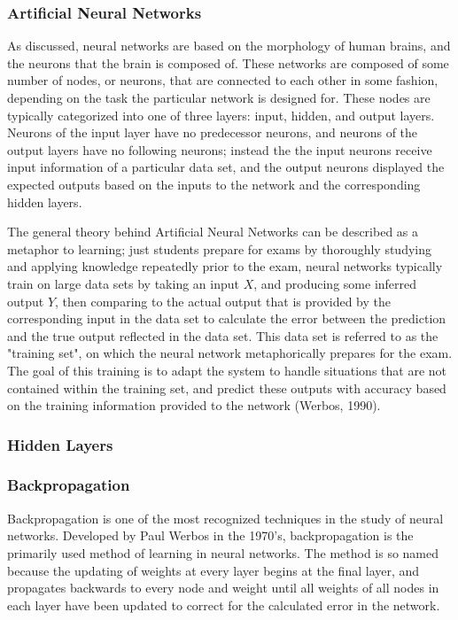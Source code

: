 \documentclass{article}
\begin{document}
\subsubsection{Artificial Neural Networks}
As discussed, neural networks are based on the morphology of human brains, and the neurons that the brain is composed of. These networks are composed of some number of nodes, or neurons, that are connected to each other in some fashion, depending on the task the particular network is designed for. These nodes are typically categorized into one of three layers: input, hidden, and output layers. Neurons of the input layer have no predecessor neurons, and neurons of the output layers have no following neurons; instead the the input neurons receive input information of a particular data set, and the output neurons displayed the expected outputs based on the inputs to the network and the corresponding hidden layers.\par

The general theory behind Artificial Neural Networks can be described as a metaphor to learning; just students prepare for exams by thoroughly studying and applying knowledge repeatedly prior to the exam, neural networks typically train on large data sets by taking an input $X$, and producing some inferred output $Y$, then comparing to the actual output that is provided by the corresponding input in the data set to calculate the error between the prediction and the true output reflected in the data set. This data set is referred to as the "training set", on which the neural network  metaphorically prepares for the exam. The goal of this training is to adapt the system to handle situations that are not contained within the training set, and predict these outputs with accuracy based on the training information provided to the network (Werbos, 1990).\par

\subsubsection{Hidden Layers}

\subsubsection{Backpropagation}
Backpropagation is one of the most recognized techniques in the study of neural networks. Developed by Paul Werbos in the 1970's, backpropagation is the primarily used method of learning in neural networks. The method is so named because the updating of weights at every layer begins at the final layer, and propagates backwards to every node and weight until all weights of all nodes in each layer have been updated to correct for the calculated error in the network.
\end{document}
